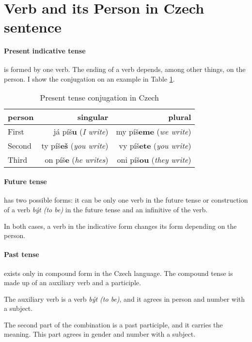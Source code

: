 \section{Verb and its Person in Czech sentence}

\paragraph{Present indicative tense} is formed by one verb. The ending of a verb depends, among other things, on the person. I show the conjugation on an example in Table \ref{tab:present}.

\begin{table}[!ht]
	\caption{Present tense conjugation in Czech}
	\label{tab:present}
	\begin{center}
		\begin{tabular}{l|r|r}
			person & singular & plural \\
			\hline
			First & já píš\textbf{u} (\emph{I write}) & my píš\textbf{eme} (\emph{we write}) \\
			Second & ty píš\textbf{eš} (\emph{you write}) & vy píš\textbf{ete} (\emph{you write})  \\
			Third & on píš\textbf{e} (\emph{he writes}) & oni píš\textbf{ou} (\emph{they write})  \\
		\end{tabular}
	\end{center}
\end{table}

\paragraph{Future tense} has two possible forms: it can be only one verb in the future tense or construction of a verb \emph{být (to be)} in the future tense and an infinitive of the verb.

In both cases, a verb in the indicative form changes its form depending on the person.

\paragraph{Past tense} exists only in compound form in the Czech language. The compound tense is made up of an auxiliary verb and a participle.

The auxiliary verb is a verb \emph{být (to be)}, and it agrees in person and number with a subject.

The second part of the combination is a past participle, and it carries the meaning. This part agrees in gender and number with a subject.

